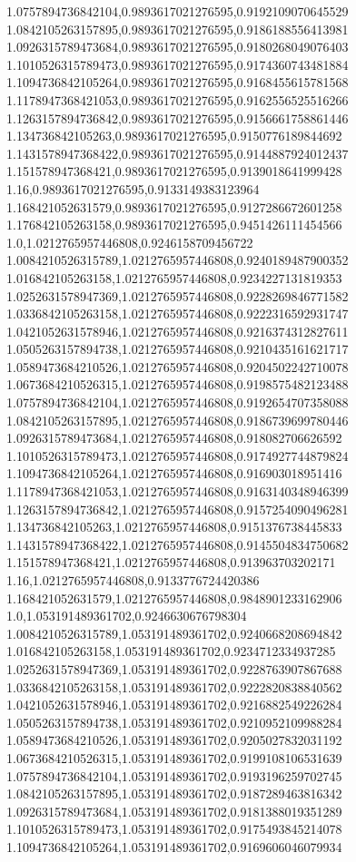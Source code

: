 1.0757894736842104,0.9893617021276595,0.9192109070645529
1.0842105263157895,0.9893617021276595,0.9186188556413981
1.0926315789473684,0.9893617021276595,0.9180268049076403
1.1010526315789473,0.9893617021276595,0.9174360743481884
1.1094736842105264,0.9893617021276595,0.9168455615781568
1.1178947368421053,0.9893617021276595,0.9162556525516266
1.1263157894736842,0.9893617021276595,0.9156661758861446
1.134736842105263,0.9893617021276595,0.9150776189844692
1.1431578947368422,0.9893617021276595,0.9144887924012437
1.151578947368421,0.9893617021276595,0.9139018641999428
1.16,0.9893617021276595,0.9133149383123964
1.168421052631579,0.9893617021276595,0.9127286672601258
1.176842105263158,0.9893617021276595,0.9451426111454566
1.0,1.0212765957446808,0.9246158709456722
1.0084210526315789,1.0212765957446808,0.9240189487900352
1.016842105263158,1.0212765957446808,0.9234227131819353
1.0252631578947369,1.0212765957446808,0.9228269846771582
1.0336842105263158,1.0212765957446808,0.9222316592931747
1.0421052631578946,1.0212765957446808,0.9216374312827611
1.0505263157894738,1.0212765957446808,0.9210435161621717
1.0589473684210526,1.0212765957446808,0.9204502242710078
1.0673684210526315,1.0212765957446808,0.9198575482123488
1.0757894736842104,1.0212765957446808,0.9192654707358088
1.0842105263157895,1.0212765957446808,0.9186739699780446
1.0926315789473684,1.0212765957446808,0.918082706626592
1.1010526315789473,1.0212765957446808,0.9174927744879824
1.1094736842105264,1.0212765957446808,0.916903018951416
1.1178947368421053,1.0212765957446808,0.9163140348946399
1.1263157894736842,1.0212765957446808,0.9157254090496281
1.134736842105263,1.0212765957446808,0.9151376738445833
1.1431578947368422,1.0212765957446808,0.9145504834750682
1.151578947368421,1.0212765957446808,0.913963703202171
1.16,1.0212765957446808,0.9133776724420386
1.168421052631579,1.0212765957446808,0.9848901233162906
1.0,1.053191489361702,0.9246630676798304
1.0084210526315789,1.053191489361702,0.9240668208694842
1.016842105263158,1.053191489361702,0.9234712334937285
1.0252631578947369,1.053191489361702,0.9228763907867688
1.0336842105263158,1.053191489361702,0.9222820838840562
1.0421052631578946,1.053191489361702,0.9216882549226284
1.0505263157894738,1.053191489361702,0.9210952109988284
1.0589473684210526,1.053191489361702,0.9205027832031192
1.0673684210526315,1.053191489361702,0.9199108106531639
1.0757894736842104,1.053191489361702,0.9193196259702745
1.0842105263157895,1.053191489361702,0.9187289463816342
1.0926315789473684,1.053191489361702,0.9181388019351289
1.1010526315789473,1.053191489361702,0.9175493845214078
1.1094736842105264,1.053191489361702,0.9169606046079934
